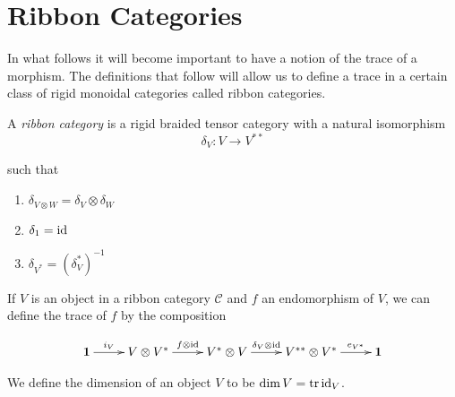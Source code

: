 \section{Ribbon Categories}

In what follows it will become important to have a notion of the trace of a
morphism. The definitions that follow will allow us to define a trace in a
certain class of rigid monoidal categories called ribbon categories.

\begin{defn}

    A \emph{ribbon category} is a rigid braided tensor category with a natural
    isomorphism
    \begin{equation}
        \delta_V: V \to V^{**}
    \end{equation}

such that 
\begin{enumerate}
    \renewcommand{\labelenumi}{\roman{enumi})}

    \item $\delta_{V \otimes W} = \delta_V \otimes \delta_W$
    \item $\delta_1 = \operatorname{id}$
    \item $\delta_{V^*} = (\delta_V^*)^{-1}$
\end{enumerate}

\end{defn}

If $V$ is an object in a ribbon category $\mathcal{C}$ and $f$ an endomorphism
of $V$, we can define the trace of $f$ by the composition

\begin{equation}
    \xymatrix{
    \mathbf{1} \ar[r]^-{i_V} & V \otimes V^* \ar[r]^-{f \otimes \id} & V^* \otimes V \ar[r]^-{\delta_V \otimes \id} & V^{**} \otimes V^* \ar[r]^-{e_{V^*}} & 
    \mathbf{1}
    }
\end{equation}

We define the dimension of an object $V$ to be $\dim V = \operatorname{tr} \operatorname{id}_V$.

